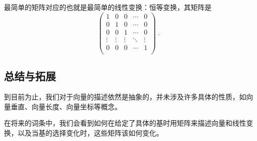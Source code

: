 最简单的矩阵对应的也就是最简单的线性变换：恒等变换，其矩阵是
\begin{equation}
    \begin{pmatrix}
1&0&0&\cdots&0\\
0&1&0&\cdots&0\\
0&0&1&\cdots&0\\
\vdots&\vdots&\vdots&\ddots&\vdots\\
0&0&0&\cdots&1\\
    \end{pmatrix}~.
\end{equation}


\subsection{总结与拓展}

到目前为止，我们对于向量的描述依然是抽象的，并未涉及许多具体的性质，如向量垂直、向量长度、向量坐标等概念。

在将来的词条中，我们会看到如何在给定了具体的基时用矩阵来描述向量和线性变换，以及当基的选择变化时，这些矩阵该如何变化。


